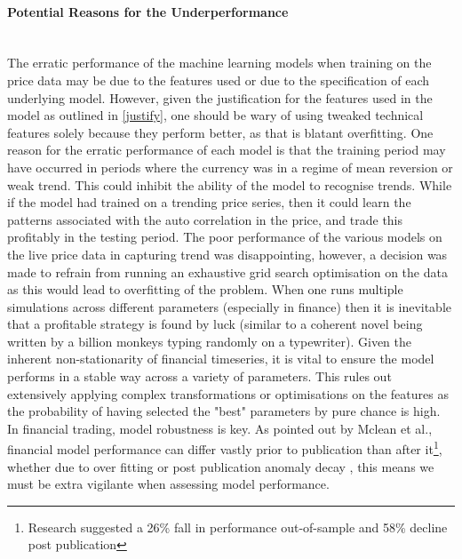 \documentclass[11pt]{article}
\newcommand{\myparagraph}[1]{\paragraph{#1}\mbox{}\\}
\begin{document}
\myparagraph{Potential Reasons for the Underperformance}
The erratic performance of the machine learning models when training on the price data may be due to the features used or due to the specification of each underlying model. However, given the justification for the features used in the model as outlined in \ref{justify}, one should be wary of using tweaked technical features  solely because they perform better, as that is blatant overfitting. One reason for the erratic performance of each model is that the training period may have occurred in periods where the currency was in a regime of mean reversion or weak trend. This could inhibit the ability of the model to recognise trends. While if the model had trained on a trending price series, then it could learn the patterns associated with the auto correlation in the price, and trade this profitably in the testing period. \newline 
The poor performance of the various models on the live price data in capturing trend was disappointing, however, a decision was made to refrain from running an exhaustive grid search optimisation on the data as this would lead to overfitting of the problem. When one runs multiple simulations across different parameters (especially in finance) then it is inevitable that a profitable strategy is found by luck (similar to a coherent novel being written by a billion monkeys typing randomly on a typewriter). Given the inherent non-stationarity of financial timeseries, it is vital to ensure the model performs in a stable way across a variety of parameters. This rules out extensively applying complex transformations or optimisations on the features as the probability of having selected the "best" parameters by pure chance is high. In financial trading, model robustness is key. \newline As pointed out by Mclean et al.\cite{Mclean2016}, financial model performance can differ vastly prior to publication than after it\footnote{Research suggested a 26\% fall in performance out-of-sample and 58\% decline post publication}, whether due to over fitting or post publication anomaly decay \cite{Bartram2019}, this means we must be extra vigilante when assessing model performance.
\end{document}
